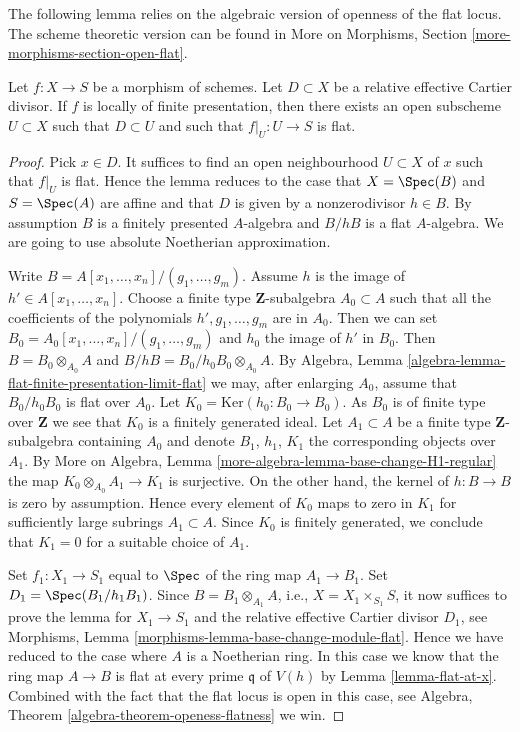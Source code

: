 \noindent
The following lemma relies on the algebraic version of
openness of the flat locus. The scheme theoretic version can be found in
More on Morphisms, Section \ref{more-morphisms-section-open-flat}.

\begin{lemma}
\label{lemma-flat-relative-Cartier-divisor}
Let $f : X \to S$ be a morphism of schemes.
Let $D \subset X$ be a relative effective Cartier divisor.
If $f$ is locally of finite presentation, then there exists
an open subscheme $U \subset X$ such that $D \subset U$ and
such that $f|_U : U \to S$ is flat.
\end{lemma}

\begin{proof}
Pick $x \in D$. It suffices to find an open neighbourhood $U \subset X$
of $x$ such that $f|_U$ is flat. Hence the lemma reduces to the case
that $X = \Spec(B)$ and $S = \Spec(A)$ are affine
and that $D$ is given by a nonzerodivisor $h \in B$. By assumption
$B$ is a finitely presented $A$-algebra and $B/hB$ is a flat
$A$-algebra. We are going to use absolute Noetherian approximation.

\medskip\noindent
Write $B = A[x_1, \ldots, x_n]/(g_1, \ldots, g_m)$. Assume
$h$ is the image of $h' \in A[x_1, \ldots, x_n]$. Choose a finite type
$\mathbf{Z}$-subalgebra $A_0 \subset A$ such that all the coefficients
of the polynomials $h', g_1, \ldots, g_m$ are in $A_0$. Then we can set
$B_0 = A_0[x_1, \ldots, x_n]/(g_1, \ldots, g_m)$ and $h_0$ the image
of $h'$ in $B_0$. Then $B = B_0 \otimes_{A_0} A$ and
$B/hB = B_0/h_0B_0 \otimes_{A_0} A$. By Algebra, Lemma
\ref{algebra-lemma-flat-finite-presentation-limit-flat}
we may, after enlarging $A_0$, assume that $B_0/h_0B_0$ is flat
over $A_0$. Let $K_0 = \text{Ker}(h_0 : B_0 \to B_0)$.
As $B_0$ is of finite type over $\mathbf{Z}$ we see that $K_0$ is
a finitely generated ideal. Let $A_1 \subset A$ be a finite type
$\mathbf{Z}$-subalgebra containing $A_0$ and denote $B_1$, $h_1$, $K_1$
the corresponding objects over $A_1$. By
More on Algebra, Lemma \ref{more-algebra-lemma-base-change-H1-regular}
the map $K_0 \otimes_{A_0} A_1 \to K_1$ is surjective. On the other hand,
the kernel of $h : B \to B$ is zero by assumption. Hence every element
of $K_0$ maps to zero in $K_1$ for sufficiently large subrings
$A_1 \subset A$. Since $K_0$ is finitely generated, we conclude that
$K_1 = 0$ for a suitable choice of $A_1$.

\medskip\noindent
Set $f_1 : X_1 \to S_1$ equal to $\Spec$ of the
ring map $A_1 \to B_1$. Set $D_1 = \Spec(B_1/h_1B_1)$.
Since $B = B_1 \otimes_{A_1} A$, i.e., $X = X_1 \times_{S_1} S$,
it now suffices to prove the lemma for $X_1 \to S_1$ and the relative
effective Cartier divisor $D_1$, see
Morphisms, Lemma \ref{morphisms-lemma-base-change-module-flat}.
Hence we have reduced to the case where $A$ is a Noetherian ring.
In this case we know that the ring map $A \to B$ is flat at every
prime $\mathfrak q$ of $V(h)$ by
Lemma \ref{lemma-flat-at-x}.
Combined with the fact that the flat locus is open in this case, see
Algebra, Theorem \ref{algebra-theorem-openess-flatness}
we win.
\end{proof}

